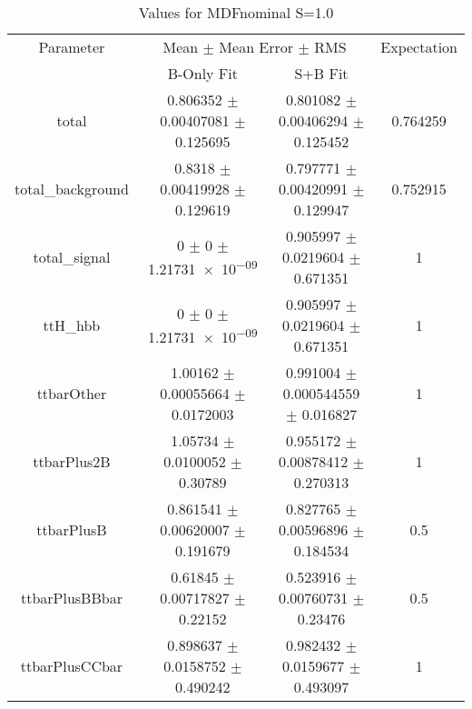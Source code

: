 \begin{table}
\centering
\caption{Values for MDFnominal S=1.0}
\begin{tabular}{cccc}
\toprule
Parameter & \multicolumn{2}{c}{Mean $\pm$ Mean Error $\pm$ RMS} & Expectation\\
 & B-Only Fit & S+B Fit & \\
\midrule
total & \num{0.806352} $\pm$ \num{0.00407081} $\pm$ \num{0.125695} & \num{0.801082} $\pm$ \num{0.00406294} $\pm$ \num{0.125452} & \num{0.764259}\\
total\_background & \num{0.8318} $\pm$ \num{0.00419928} $\pm$ \num{0.129619} & \num{0.797771} $\pm$ \num{0.00420991} $\pm$ \num{0.129947} & \num{0.752915}\\
total\_signal & \num{0} $\pm$ \num{0} $\pm$ \num{1.21731e-09} & \num{0.905997} $\pm$ \num{0.0219604} $\pm$ \num{0.671351} & \num{1}\\
ttH\_hbb & \num{0} $\pm$ \num{0} $\pm$ \num{1.21731e-09} & \num{0.905997} $\pm$ \num{0.0219604} $\pm$ \num{0.671351} & \num{1}\\
ttbarOther & \num{1.00162} $\pm$ \num{0.00055664} $\pm$ \num{0.0172003} & \num{0.991004} $\pm$ \num{0.000544559} $\pm$ \num{0.016827} & \num{1}\\
ttbarPlus2B & \num{1.05734} $\pm$ \num{0.0100052} $\pm$ \num{0.30789} & \num{0.955172} $\pm$ \num{0.00878412} $\pm$ \num{0.270313} & \num{1}\\
ttbarPlusB & \num{0.861541} $\pm$ \num{0.00620007} $\pm$ \num{0.191679} & \num{0.827765} $\pm$ \num{0.00596896} $\pm$ \num{0.184534} & \num{0.5}\\
ttbarPlusBBbar & \num{0.61845} $\pm$ \num{0.00717827} $\pm$ \num{0.22152} & \num{0.523916} $\pm$ \num{0.00760731} $\pm$ \num{0.23476} & \num{0.5}\\
ttbarPlusCCbar & \num{0.898637} $\pm$ \num{0.0158752} $\pm$ \num{0.490242} & \num{0.982432} $\pm$ \num{0.0159677} $\pm$ \num{0.493097} & \num{1}\\
\bottomrule
\end{tabular}
\end{table}